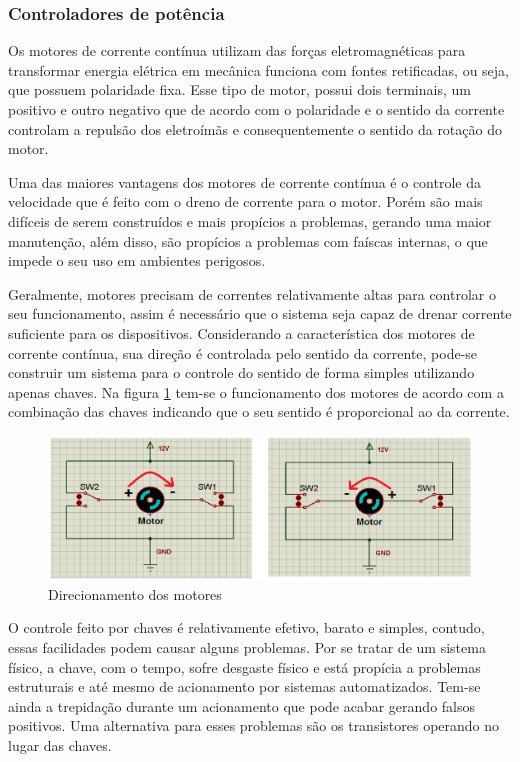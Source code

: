 \subsubsection{Controladores de potência}

Os motores de corrente contínua utilizam das forças eletromagnéticas para transformar energia elétrica em mecânica funciona com fontes retificadas, ou seja, que possuem polaridade fixa. Esse tipo de motor, possui dois terminais, um positivo e outro negativo que de acordo com o polaridade e o sentido da corrente controlam a repulsão dos eletroímãs e consequentemente o sentido da rotação do motor.

Uma das maiores vantagens dos motores de corrente contínua é o controle da velocidade que é feito com o dreno de corrente para o motor. Porém são mais difíceis de serem construídos e mais propícios a problemas, gerando uma maior manutenção, além disso, são propícios a problemas com faíscas internas, o que impede o seu uso em ambientes perigosos.

Geralmente, motores precisam de correntes relativamente altas para controlar o seu funcionamento, assim é necessário que o sistema seja capaz de drenar corrente suficiente para os dispositivos. Considerando a característica dos motores de corrente contínua, sua direção é controlada pelo sentido da corrente, pode-se construir um sistema para o controle do sentido de forma simples utilizando apenas chaves. Na figura \ref{fig:direcionamento_motores} tem-se o funcionamento dos motores de acordo com a combinação das chaves indicando que o seu sentido é proporcional ao da corrente.

\begin{figure}[!htb]
\centering
  \includegraphics[keepaspectratio=true,scale=0.6]{figuras/controle/direcionamento_motores}
\caption{Direcionamento dos motores}
\label{fig:direcionamento_motores}
\end{figure}

O controle feito por chaves é relativamente efetivo, barato e simples, contudo, essas facilidades podem causar alguns problemas. Por se tratar de um sistema físico, a chave, com o tempo, sofre desgaste físico e está propícia a problemas estruturais e até mesmo de acionamento por sistemas automatizados. Tem-se ainda a trepidação durante um acionamento que pode acabar gerando falsos positivos. Uma alternativa para esses problemas são os transistores operando no lugar das chaves.

